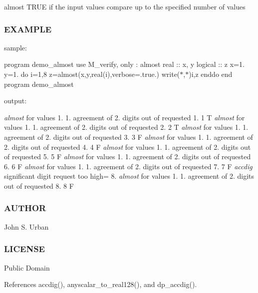 almost T\+R\+UE if the input values compare up to the specified number of values \subsubsection*{E\+X\+A\+M\+P\+LE}

sample\+:

program demo\+\_\+almost use M\+\_\+verify, only \+: almost real \+:\+: x, y logical \+:\+: z x=1. y=1. do i=1,8 z=almost(x,y,real(i),verbose=.true.) write($\ast$,$\ast$)i,z enddo end program demo\+\_\+almost

output\+:

{\itshape almost} for values 1. 1. agreement of 2. digits out of requested 1. 1 T {\itshape almost} for values 1. 1. agreement of 2. digits out of requested 2. 2 T {\itshape almost} for values 1. 1. agreement of 2. digits out of requested 3. 3 F {\itshape almost} for values 1. 1. agreement of 2. digits out of requested 4. 4 F {\itshape almost} for values 1. 1. agreement of 2. digits out of requested 5. 5 F {\itshape almost} for values 1. 1. agreement of 2. digits out of requested 6. 6 F {\itshape almost} for values 1. 1. agreement of 2. digits out of requested 7. 7 F {\itshape accdig} significant digit request too high= 8. {\itshape almost} for values 1. 1. agreement of 2. digits out of requested 8. 8 F \subsubsection*{A\+U\+T\+H\+OR}

John S. Urban \subsubsection*{L\+I\+C\+E\+N\+SE}

Public Domain 

References accdig(), anyscalar\+\_\+to\+\_\+real128(), and dp\+\_\+accdig().


